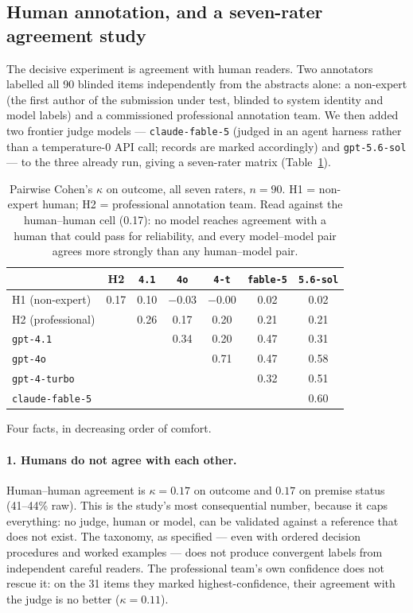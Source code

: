 \subsection{Human annotation, and a seven-rater agreement study}
\label{sec:judgeval:human}

The decisive experiment is agreement with human readers. Two annotators
labelled all 90 blinded items independently from the abstracts alone: a
non-expert (the first author of the submission under test, blinded to
system identity and model labels) and a commissioned professional
annotation team. We then added two frontier judge models ---
\texttt{claude-fable-5} (judged in an agent harness rather than a
temperature-0 API call; records are marked accordingly) and
\texttt{gpt-5.6-sol} --- to the three already run, giving a seven-rater
matrix (Table~\ref{tab:sevenway}).

\begin{table}[t]
  \centering
  \small
  \caption{Pairwise Cohen's $\kappa$ on outcome, all seven raters,
  $n=90$. H1 = non-expert human; H2 = professional annotation team.
  Read against the human--human cell (0.17): no model reaches
  agreement with a human that could pass for reliability, and every
  model--model pair agrees more strongly than any human--model pair.}
  \label{tab:sevenway}
  \begin{tabular}{@{}lcccccc@{}}
    \toprule
    & H2 & \texttt{4.1} & \texttt{4o} & \texttt{4-t} & \texttt{fable-5} & \texttt{5.6-sol} \\
    \midrule
    H1 (non-expert)   & 0.17 & 0.10 & $-$0.03 & $-$0.00 & 0.02 & 0.02 \\
    H2 (professional) &      & 0.26 & 0.17 & 0.20 & 0.21 & 0.21 \\
    \texttt{gpt-4.1}  &      &      & 0.34 & 0.20 & 0.47 & 0.31 \\
    \texttt{gpt-4o}   &      &      &      & 0.71 & 0.47 & 0.58 \\
    \texttt{gpt-4-turbo} &   &      &      &      & 0.32 & 0.51 \\
    \texttt{claude-fable-5} & &     &      &      &      & 0.60 \\
    \bottomrule
  \end{tabular}
\end{table}

Four facts, in decreasing order of comfort.

\paragraph{1. Humans do not agree with each other.} Human--human
agreement is $\kappa=0.17$ on outcome and $0.17$ on premise status
(41--44\% raw). This is the study's most consequential number, because
it caps everything: no judge, human or model, can be validated against
a reference that does not exist. The taxonomy, as specified --- even
with ordered decision procedures and worked examples --- does not
produce convergent labels from independent careful readers. The
professional team's own confidence does not rescue it: on the 31 items
they marked highest-confidence, their agreement with the judge is no
better ($\kappa=0.11$).


